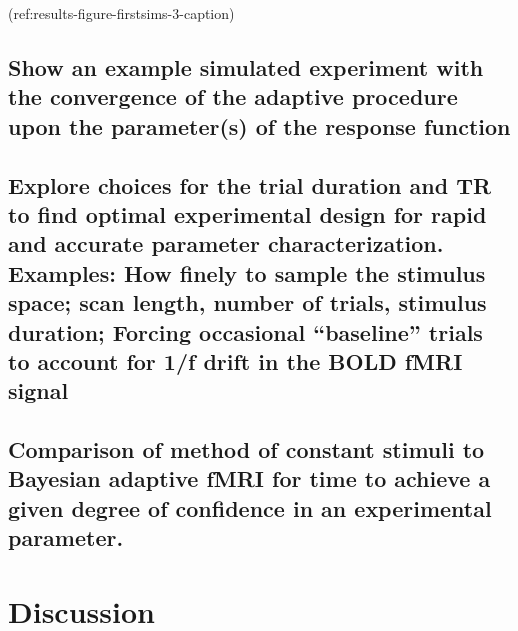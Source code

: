 \documentclass[
  man,floatsintext]{apa6}
\begin{document}
(ref:results-figure-firstsims-3-caption)
\newpage

\hypertarget{show-an-example-simulated-experiment-with-the-convergence-of-the-adaptive-procedure-upon-the-parameters-of-the-response-function}{%
\subsection{Show an example simulated experiment with the convergence of the adaptive procedure upon the parameter(s) of the response function}\label{show-an-example-simulated-experiment-with-the-convergence-of-the-adaptive-procedure-upon-the-parameters-of-the-response-function}}

\hypertarget{explore-choices-for-the-trial-duration-and-tr-to-find-optimal-experimental-design-for-rapid-and-accurate-parameter-characterization.-examples-how-finely-to-sample-the-stimulus-space-scan-length-number-of-trials-stimulus-duration-forcing-occasional-baseline-trials-to-account-for-1f-drift-in-the-bold-fmri-signal}{%
\subsection{Explore choices for the trial duration and TR to find optimal experimental design for rapid and accurate parameter characterization. Examples: How finely to sample the stimulus space; scan length, number of trials, stimulus duration; Forcing occasional ``baseline'' trials to account for 1/f drift in the BOLD fMRI signal}\label{explore-choices-for-the-trial-duration-and-tr-to-find-optimal-experimental-design-for-rapid-and-accurate-parameter-characterization.-examples-how-finely-to-sample-the-stimulus-space-scan-length-number-of-trials-stimulus-duration-forcing-occasional-baseline-trials-to-account-for-1f-drift-in-the-bold-fmri-signal}}

\hypertarget{comparison-of-method-of-constant-stimuli-to-bayesian-adaptive-fmri-for-time-to-achieve-a-given-degree-of-confidence-in-an-experimental-parameter.}{%
\subsection{Comparison of method of constant stimuli to Bayesian adaptive fMRI for time to achieve a given degree of confidence in an experimental parameter.}\label{comparison-of-method-of-constant-stimuli-to-bayesian-adaptive-fmri-for-time-to-achieve-a-given-degree-of-confidence-in-an-experimental-parameter.}}

\hypertarget{discussion}{%
\section{Discussion}\label{discussion}}
\end{document}
